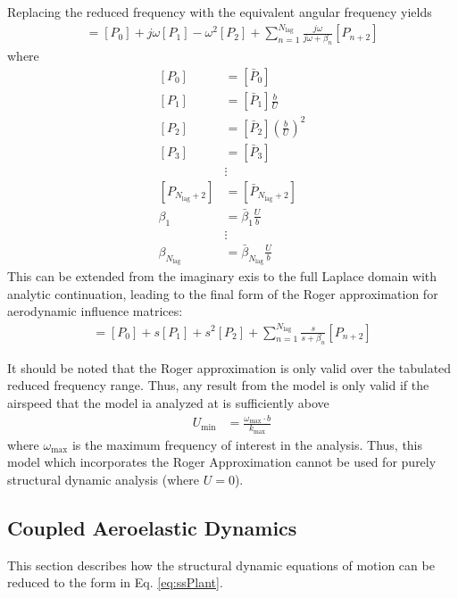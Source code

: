 Replacing the reduced frequency with the equivalent angular frequency yields
\begin{align}
	[A(j\omega)] = [P_0] + j\omega [P_1] - \omega^2 [P_2] + \sum_{n=1}^{N_\text{lag}} \frac{j\omega}{j\omega+\beta_n} [P_{n+2}]
\end{align}
where
\begin{equation}
\begin{aligned}
	[P_0] &= [\bar{P}_0] \\
	[P_1] &= [\bar{P}_1] \frac{b}{U} \\
	[P_2] &= [\bar{P}_2] \left(\frac{b}{U}\right)^2 \\
	[P_3] &= [\bar{P}_3] \\
	&\vdots \\
	[P_{N_\text{lag}+2}] &= 	[\bar{P}_{N_\text{lag}+2}] \\
	\beta_1 &= \bar{\beta}_1 \frac{U}{b} \\
	&\vdots \\
	\beta_{N_\text{lag}} &= \bar{\beta}_{N_\text{lag}} \frac{U}{b}
\end{aligned}
\end{equation}
This can be extended from the imaginary exis to the full Laplace domain with analytic continuation, leading to the final form of the Roger approximation for aerodynamic influence matrices:
\begin{align}
	[A(s)] = [P_0] + s [P_1] + s^2 [P_2] + \sum_{n=1}^{N_\text{lag}} \frac{s}{s+\beta_n} [P_{n+2}]
\end{align}

It should be noted that the Roger approximation is only valid over the tabulated reduced frequency range. Thus, any result from the model is only valid if the airspeed that the model ia analyzed at is sufficiently above
\begin{align}
	U_\text{min} &= \frac{\omega_\text{max} \cdot b}{k_\text{max}}
\end{align}
where $\omega_\text{max}$ is the maximum frequency of interest in the analysis. Thus, this model which incorporates the Roger Approximation cannot be used for purely structural dynamic analysis (where $U=0$).

\subsection{Coupled Aeroelastic Dynamics}

This section describes how the structural dynamic equations of motion can be reduced to the form in Eq. \ref{eq:ssPlant}.

